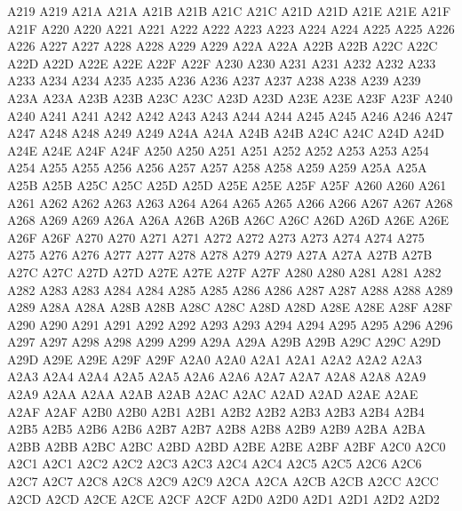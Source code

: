 \ID A219 A219
\ID A21A A21A
\ID A21B A21B
\ID A21C A21C
\ID A21D A21D
\ID A21E A21E
\ID A21F A21F
\ID A220 A220
\ID A221 A221
\ID A222 A222
\ID A223 A223
\ID A224 A224
\ID A225 A225
\ID A226 A226
\ID A227 A227
\ID A228 A228
\ID A229 A229
\ID A22A A22A
\ID A22B A22B
\ID A22C A22C
\ID A22D A22D
\ID A22E A22E
\ID A22F A22F
\ID A230 A230
\ID A231 A231
\ID A232 A232
\ID A233 A233
\ID A234 A234
\ID A235 A235
\ID A236 A236
\ID A237 A237
\ID A238 A238
\ID A239 A239
\ID A23A A23A
\ID A23B A23B
\ID A23C A23C
\ID A23D A23D
\ID A23E A23E
\ID A23F A23F
\ID A240 A240
\ID A241 A241
\ID A242 A242
\ID A243 A243
\ID A244 A244
\ID A245 A245
\ID A246 A246
\ID A247 A247
\ID A248 A248
\ID A249 A249
\ID A24A A24A
\ID A24B A24B
\ID A24C A24C
\ID A24D A24D
\ID A24E A24E
\ID A24F A24F
\ID A250 A250
\ID A251 A251
\ID A252 A252
\ID A253 A253
\ID A254 A254
\ID A255 A255
\ID A256 A256
\ID A257 A257
\ID A258 A258
\ID A259 A259
\ID A25A A25A
\ID A25B A25B
\ID A25C A25C
\ID A25D A25D
\ID A25E A25E
\ID A25F A25F
\ID A260 A260
\ID A261 A261
\ID A262 A262
\ID A263 A263
\ID A264 A264
\ID A265 A265
\ID A266 A266
\ID A267 A267
\ID A268 A268
\ID A269 A269
\ID A26A A26A
\ID A26B A26B
\ID A26C A26C
\ID A26D A26D
\ID A26E A26E
\ID A26F A26F
\ID A270 A270
\ID A271 A271
\ID A272 A272
\ID A273 A273
\ID A274 A274
\ID A275 A275
\ID A276 A276
\ID A277 A277
\ID A278 A278
\ID A279 A279
\ID A27A A27A
\ID A27B A27B
\ID A27C A27C
\ID A27D A27D
\ID A27E A27E
\ID A27F A27F
\ID A280 A280
\ID A281 A281
\ID A282 A282
\ID A283 A283
\ID A284 A284
\ID A285 A285
\ID A286 A286
\ID A287 A287
\ID A288 A288
\ID A289 A289
\ID A28A A28A
\ID A28B A28B
\ID A28C A28C
\ID A28D A28D
\ID A28E A28E
\ID A28F A28F
\ID A290 A290
\ID A291 A291
\ID A292 A292
\ID A293 A293
\ID A294 A294
\ID A295 A295
\ID A296 A296
\ID A297 A297
\ID A298 A298
\ID A299 A299
\ID A29A A29A
\ID A29B A29B
\ID A29C A29C
\ID A29D A29D
\ID A29E A29E
\ID A29F A29F
\ID A2A0 A2A0
\ID A2A1 A2A1
\ID A2A2 A2A2
\ID A2A3 A2A3
\ID A2A4 A2A4
\ID A2A5 A2A5
\ID A2A6 A2A6
\ID A2A7 A2A7
\ID A2A8 A2A8
\ID A2A9 A2A9
\ID A2AA A2AA
\ID A2AB A2AB
\ID A2AC A2AC
\ID A2AD A2AD
\ID A2AE A2AE
\ID A2AF A2AF
\ID A2B0 A2B0
\ID A2B1 A2B1
\ID A2B2 A2B2
\ID A2B3 A2B3
\ID A2B4 A2B4
\ID A2B5 A2B5
\ID A2B6 A2B6
\ID A2B7 A2B7
\ID A2B8 A2B8
\ID A2B9 A2B9
\ID A2BA A2BA
\ID A2BB A2BB
\ID A2BC A2BC
\ID A2BD A2BD
\ID A2BE A2BE
\ID A2BF A2BF
\ID A2C0 A2C0
\ID A2C1 A2C1
\ID A2C2 A2C2
\ID A2C3 A2C3
\ID A2C4 A2C4
\ID A2C5 A2C5
\ID A2C6 A2C6
\ID A2C7 A2C7
\ID A2C8 A2C8
\ID A2C9 A2C9
\ID A2CA A2CA
\ID A2CB A2CB
\ID A2CC A2CC
\ID A2CD A2CD
\ID A2CE A2CE
\ID A2CF A2CF
\ID A2D0 A2D0
\ID A2D1 A2D1
\ID A2D2 A2D2
